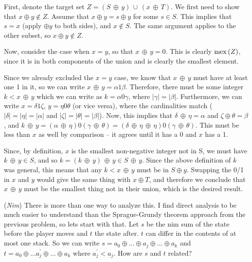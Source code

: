 \vskip 0.08in  First, denote the
target set $Z = \left(S \, \oplus \, y\right) \, \cup \, \left(x \, \oplus \, T\right)$.
We first need to show that $x \oplus y \notin Z$.  Assume
that $x \oplus y = s \oplus y$ for some $s \in S$.  This implies that $s = x$
(apply $\oplus y$ to both sides), and $x \notin S$.  The same argument
applies to the other subset, so $x \oplus y \notin Z$.

Now, consider the case when $x = y$, so that $x \, \oplus \, y = 0$.  This is clearly 
${\rm mex}\left(Z\right)$,
since it is in both components of the union and is clearly the smallest element.

Since we already excluded the $x = y$ case,
we know that $x \, \oplus \, y$ must have at least one 1 in it, so
we can write $x \, \oplus \, y = \alpha 1 \beta$.  Therefore, there must be
some integer $k < x \, \oplus \, y$ which we can write as
$k = \alpha 0 \gamma$, where $| \gamma | = | \beta |$.  Furthermore,
we can write $x = \delta 1 \zeta$, $y = \eta 0 \theta$ (or vice versa),
where the cardinalities match ($|\delta| = | \eta | = | \alpha |$
and  $|\zeta| = |\theta| = |\beta|$).  Now, this implies that $\delta \, \oplus \, \eta = \alpha$
and $\zeta \oplus \theta = \beta$, and $k \, \oplus \, y = \left(\alpha \, \oplus \, \eta\right)
0 \left(\gamma \, \oplus \, \theta\right) = \left(\delta \, \oplus \, \eta \, \oplus \, \eta\right)
0 \left(\gamma \, \oplus \, \theta\right)$.  This must be less than $x$ as well by
comparison -- it agrees until it has a 0 and $x$ has a 1.  

Since, by definition,
$x$ is the smallest non-negative integer not in S, we must have $k \, \oplus \, y \in S$,
and so $k  = \left(k \, \oplus \, y\right) \, \oplus \, y \in S \, \oplus \, y$.
Since the above definition of $k$ was general, this means that any $k < x \, \oplus \, y$
must be in $S \oplus y$.  Swapping the 0/1 in $x$ and $y$ would give the same
thing with $x \oplus T$, and therefore we conclude that $x \, \oplus \, y$
must be the smallest thing not in their union, which is the desired result.

\vskip 0.08in  ({\it Nim}) \hfil\break
There is more than one way to analyze this.  I find direct
analysis to be much easier to understand than the Sprague-Grundy
theorem approach from the previous problem, so lets start with that.
Let $s$ be the nim sum of the state before the player moves
and $t$ the state after.  $t$ can differ in the contents of at most
one stack.  So we can write 
$s = a_0 \oplus \ldots \oplus a_j \oplus \ldots \oplus a_k$ and 
$t = a_0 \oplus \ldots a^{\prime}_j \oplus \ldots \oplus a_k$ 
where $a^{\prime}_j < a_j$.  How are $s$ and $t$ related?

